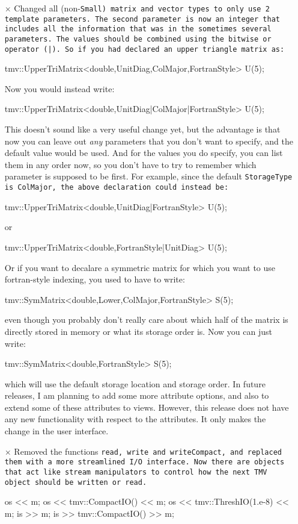 \begin{itemize}
\item[$\times$]
Changed all (non-\tt{Small}) matrix and vector types to only use 2 template
parameters.  The second parameter is now an integer that includes all
the information that was in the sometimes several parameters.  The 
values should be combined using the bitwise or operator (\tt{|}).  
So if you had declared an upper triangle matrix as:
\begin{tmvcode}
tmv::UpperTriMatrix<double,UnitDiag,ColMajor,FortranStyle> U(5);
\end{tmvcode}
Now you would instead write:
\begin{tmvcode}
tmv::UpperTriMatrix<double,UnitDiag|ColMajor|FortranStyle> U(5);
\end{tmvcode}
This doesn't sound like a very useful change yet, but the advantage is that
now you can leave out {\em any} parameters that you don't want to specify,
and the default value would be used.  And for the values you do specify, you can list them in any order now,
so you don't have to try to remember which parameter is supposed to be first.  For example, since the default 
\tt{StorageType} is \tt{ColMajor}, the above declaration could instead be:
\begin{tmvcode}
tmv::UpperTriMatrix<double,UnitDiag|FortranStyle> U(5);
\end{tmvcode}
or
\begin{tmvcode}
tmv::UpperTriMatrix<double,FortranStyle|UnitDiag> U(5);
\end{tmvcode}
Or if you want to decalare a symmetric matrix for which you want to
use fortran-style indexing, you used to have to write:
\begin{tmvcode}
tmv::SymMatrix<double,Lower,ColMajor,FortranStyle> S(5);
\end{tmvcode}
even though you probably don't really care about which half of the 
matrix is directly stored in memory or what its storage order is.
Now you can just write:
\begin{tmvcode}
tmv::SymMatrix<double,FortranStyle> S(5);
\end{tmvcode}
which will use the default storage location and storage order.
In future releases, I am planning to add some more attribute options,
and also to extend some of these attributes to views.  However,
this release does not have any new functionality with respect to the
attributes.  It only makes the change in the user interface.
 
\item[$\times$]
Removed the functions \tt{read}, \tt{write} and \tt{writeCompact}, and replaced them with a more streamlined I/O interface. Now there are objects that act like stream manipulators to control how the next TMV object should be written or read.
\begin{tmvcode}
os << m;  
os << tmv::CompactIO() << m;
os << tmv::ThreshIO(1.e-8) << m;
is >> m;
is >> tmv::CompactIO() >> m;
\end{tmvcode}


\end{itemize}
